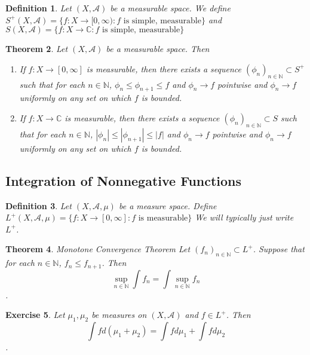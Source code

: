 \documentclass[12pt]{amsart}
\newtheorem{thm}{Theorem}[section]
\newtheorem{defn}[thm]{Definition}
\newtheorem{ex}[thm]{Exercise}
\newcommand{\C}{\mathbb{C}}
\newcommand{\N}{\mathbb{N}}
\newcommand{\MA}{\mathcal{A}}
\newcommand{\RG}{[0,\infty]}
\newcommand{\Rg}{[0,\infty)}
\begin{document}
\begin{defn}
Let $(X,\MA)$ be a measurable space. We define $S^+(X,\MA) = \{f:X \rightarrow \Rg: f \text{ is simple, measurable}\}$ and $S(X,\MA) = \{f: X \rightarrow \C: f \text{ is simple, measurable}\}$
\end{defn}

\begin{thm}
Let $(X, \MA)$ be a measurable space. Then 
\begin{enumerate}
\item If $f: X \rightarrow \RG$ is measurable, then there exists a sequence $(\phi_n)_{n \in \N} \subset S^+$ such that for each $n \in \N$, $\phi_n \leq \phi_{n+1} \leq f$ and $\phi_n \rightarrow f$ pointwise and $\phi_n \rightarrow f$ uniformly on any set on which $f$ is bounded.

\item If $f: X \rightarrow \C$ is measurable, then there exists a sequence $(\phi_n)_{n \in \N} \subset S$ such that for each $n \in \N$, $|\phi_n| \leq |\phi_{n+1}| \leq |f|$ and $\phi_n \rightarrow f$ pointwise and $\phi_n \rightarrow f$ uniformly on any set on which $f$ is bounded.
\end{enumerate}
\end{thm}

\subsection{Integration of Nonnegative Functions}

\begin{defn}
Let $(X, \MA, \mu)$ be a measure space. Define $L^{+}(X, \MA, \mu) = \{f:X \rightarrow \RG : f \text{ is measurable}\}$ We will typically just write $L^{+}$.
\end{defn}

\begin{thm}{Monotone Convergence Theorem} 
Let $(f_n)_{n \in \N} \subset L^+$. Suppose that for each $n \in \N$, $f_n \leq f_{n+1}$. Then $$\sup_{n \in \N} \int f_n = \int \sup_{n \in \N} f_n$$.
\end{thm}

\begin{ex}
Let $\mu_1, \mu_2$ be measures on $(X, \MA)$ and $f \in L^+$. Then $$\int f d (\mu_1 + \mu_2) = \int f d\mu_1 + \int f d\mu_2$$.  
\end{ex}
\end{document}
